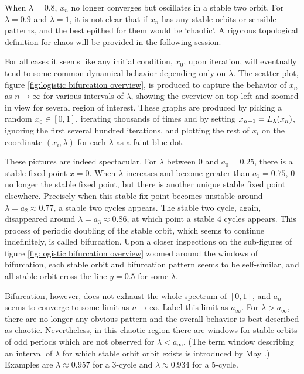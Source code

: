 When $\lambda = 0.8$, $x_n$ no longer converges but oscillates in a stable two orbit. 
For $\lambda = 0.9$ and $\lambda = 1$, it is not clear that if $x_n$ has any stable orbits or sensible patterns, and the best epithed for them would be `chaotic'.
A rigorous topological definition for chaos will be provided in the following session. 

For all cases it seems like any initial condition, $x_0$, upon iteration, will eventually tend to some common dynamical behavior depending only on $\lambda$.
The scatter plot, figure \ref{fig:logistic bifurcation overview}, is produced to capture the behavior of $x_n$ as $n \rightarrow \infty$ for various intervals of $\lambda$, showing the overview on top left and zoomed in view for several region of interest.
These graphs are produced by picking a random $x_0 \in [0,1]$, iterating thousands of times and by setting $x_{n+1} = L_{\lambda}(x_n)$, ignoring the first several hundred iterations, and plotting the rest of $x_i$ on the coordinate $(x_i, \lambda)$ for each $\lambda$ as a faint blue dot.

These pictures are indeed spectacular. 
For $\lambda$ between $0$ and $a_0 = 0.25$, there is a stable fixed point $x = 0$.
When $\lambda$ increases and become greater than $a_1 = 0.75$, $0$ no longer the stable fixed point, but there is another unique stable fixed point elsewhere.
Precisely when this stable fix point becomes unstable around $\lambda = a_2 \approx 0.77$, a stable two cycles appears.
The stable two cycle, again, disappeared around $\lambda = a_3 \approx 0.86$, at which point a stable 4 cycles appears. 
This process of periodic doubling of the stable orbit, which seems to continue indefinitely, is called bifurcation. 
Upon a closer inspections on the sub-figures of figure \ref{fig:logistic bifurcation overview} zoomed around the windows of bifurcation, each stable orbit and bifurcation pattern seems to be self-similar, and all stable orbit cross the line $y = 0.5$ for some $\lambda$.

Bifurcation, however, does not exhaust the whole spectrum of $[0,1]$, and $a_{n}$ seems to converge to some limit as $n \rightarrow \infty$. 
Label this limit as $a_{\infty}$.
For $\lambda > a_{\infty}$, there are no longer any obvious pattern and the overall behavior is best described as chaotic. 
Nevertheless, in this chaotic region there are windows for stable orbits of odd periods which are not observed for $\lambda < a_{\infty}$. (The term window describing an interval of $\lambda$ for which stable orbit orbit exists is introduced by May \cite{May_Nature}.)
Examples are $\lambda \approx 0.957$ for a 3-cycle and $\lambda \approx 0.934$ for a 5-cycle.

